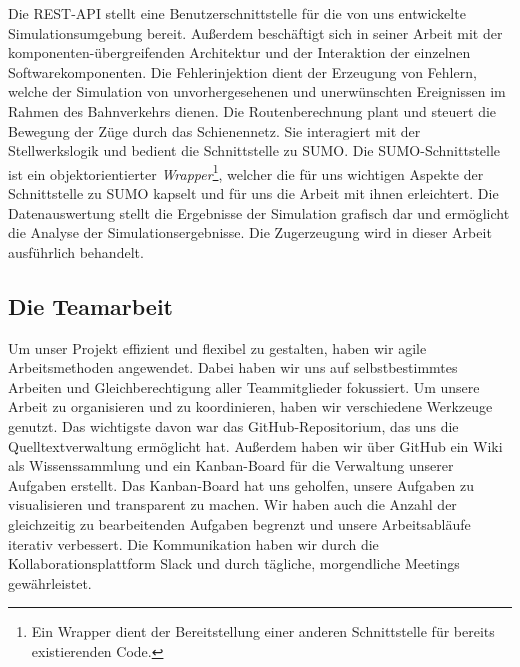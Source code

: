 Die REST-API stellt eine Benutzerschnittstelle für die von uns entwickelte Simulationsumgebung bereit. Außerdem beschäftigt sich \citeauthor{kamp_architektur_2023} in seiner Arbeit mit der komponenten-übergreifenden Architektur und der Interaktion der einzelnen Softwarekomponenten. Die Fehlerinjektion dient der Erzeugung von Fehlern, welche der Simulation von unvorhergesehenen und unerwünschten Ereignissen im Rahmen des Bahnverkehrs dienen. Die Routenberechnung plant und steuert die Bewegung der Züge durch das Schienennetz. Sie interagiert mit der Stellwerkslogik und bedient die Schnittstelle zu SUMO. Die SUMO-Schnittstelle ist ein objektorientierter \emph{Wrapper}\footnote{Ein Wrapper dient der Bereitstellung einer anderen Schnittstelle für bereits existierenden Code.}, welcher die für uns wichtigen Aspekte der Schnittstelle zu SUMO kapselt und für uns die Arbeit mit ihnen erleichtert. Die Datenauswertung stellt die Ergebnisse der Simulation grafisch dar und ermöglicht die Analyse der Simulationsergebnisse. Die Zugerzeugung wird in dieser Arbeit ausführlich behandelt.

\subsection{Die Teamarbeit}

Um unser Projekt effizient und flexibel zu gestalten, haben wir agile Arbeitsmethoden angewendet. Dabei haben wir uns auf selbstbestimmtes Arbeiten und Gleichberechtigung aller Teammitglieder fokussiert. Um unsere Arbeit zu organisieren und zu koordinieren, haben wir verschiedene Werkzeuge genutzt. Das wichtigste davon war das GitHub-Repositorium, das uns die Quelltextverwaltung ermöglicht hat. Außerdem haben wir über GitHub ein Wiki als Wissenssammlung und ein Kanban-Board für die Verwaltung unserer Aufgaben erstellt. Das Kanban-Board hat uns geholfen, unsere Aufgaben zu visualisieren und transparent zu machen. Wir haben auch die Anzahl der gleichzeitig zu bearbeitenden Aufgaben begrenzt und unsere Arbeitsabläufe iterativ verbessert. Die Kommunikation haben wir durch die Kollaborationsplattform Slack und durch tägliche, morgendliche Meetings gewährleistet.